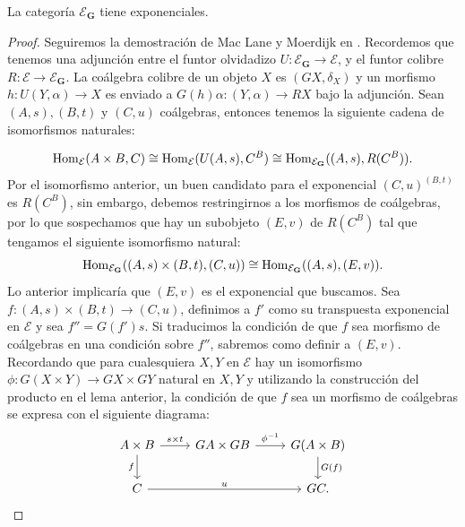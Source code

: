 \begin{lemma}
  La categoría $\mathcal{E}_\textbf{G}$ tiene exponenciales.
\end{lemma}
\begin{proof}
  Seguiremos la demostración de Mac Lane y Moerdijk en
  \cite{maclane2012sheaves}.  Recordemos que tenemos una adjunción entre el funtor olvidadizo $U\colon \mathcal{E}_\textbf{G}\to \mathcal{E}$, y el
  funtor colibre $R\colon \mathcal{E}\to \mathcal{E}_\textbf{G}$.
  La coálgebra colibre de un objeto $X$ es $(GX, \delta_X)$ y un morfismo $h\colon U(Y,\alpha)\to X$ es enviado a
  $G(h)\alpha\colon (Y,\alpha)\to RX$ bajo la adjunción. Sean $(A,s), (B,t)$ y $(C,u)$ coálgebras, entonces tenemos la siguiente cadena de isomorfismos naturales:
  
  \begin{equation*}
    \operatorname{Hom}_{\mathcal{E}}(A\times B, C) \cong \operatorname{Hom}_{\mathcal{E}}(U(A,s), C^B) \cong \operatorname{Hom}_{\mathcal{E}_\textbf{G}}((A,s), R(C^B)).
  \end{equation*}
  Por el isomorfismo anterior, un buen candidato
  para el exponencial $(C,u)^{(B,t)}$ es $R(C^B)$, sin embargo, debemos restringirnos a los morfismos
  de coálgebras, por lo que sospechamos que hay un subobjeto $(E,v)$ de $R(C^B)$ tal que tengamos
  el siguiente isomorfismo natural:
  \begin{equation*}
    \operatorname{Hom}_{\mathcal{E}_\textbf{G}}((A,s)\times (B,t), (C,u)) \cong \operatorname{Hom}_{\mathcal{E}_\textbf{G}}((A,s), (E,v)).
  \end{equation*}
  Lo anterior implicaría que $(E,v)$ es el exponencial que buscamos. Sea $f\colon (A,s)\times (B,t) \to (C,u)$,
  definimos a $f'$ como su transpuesta exponencial en $\mathcal{E}$ y sea $f''=G(f')s$. Si traducimos
  la condición de que $f$ sea morfismo de coálgebras en una condición sobre $f''$, sabremos como
  definir a $(E,v)$. Recordando que para cualesquiera $X,Y$ en $\mathcal{E}$ hay un isomorfismo 
  $\phi\colon G(X\times Y)\to GX\times GY$ natural en $X,Y$ y utilizando la construcción del producto en el lema anterior, la condición de que $f$ sea un morfismo de 
  coálgebras se expresa con el siguiente diagrama:
  \begin{equation*}
    \begin{tikzcd}
      A\times B\ar{r}{s\times t}\ar[swap]{d}{f} & GA\times GB\ar{r}{\phi^{-1}} & G(A\times B)\ar{d}{G(f)} \\
      C\ar{rr}{u} & {} & GC.
    \end{tikzcd}
  \end{equation*}

\end{proof}

